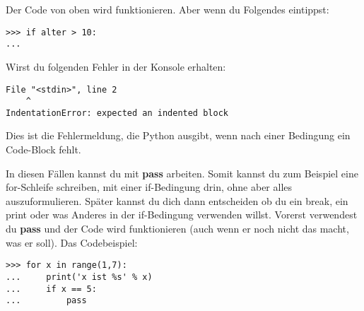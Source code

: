 \noindent
Der Code von oben wird funktionieren. Aber wenn du Folgendes eintippst:

\begin{Verbatim}[frame=single]
>>> if alter > 10:
...
\end{Verbatim}

\noindent
Wirst du folgenden Fehler in der Konsole erhalten:

\begin{Verbatim}[frame=single]
  File "<stdin>", line 2
    ^
IndentationError: expected an indented block
\end{Verbatim}

Dies ist die Fehlermeldung, die Python ausgibt, wenn nach einer Bedingung ein Code-Block fehlt.
\par
In diesen Fällen kannst du mit \textbf{pass} arbeiten. Somit kannst du zum Beispiel eine for-Schleife schreiben, mit einer if-Bedingung drin, ohne aber alles auszuformulieren. Später kannst du dich dann entscheiden ob du ein break, ein print oder was Anderes in der if-Bedingung verwenden willst. Vorerst verwendest du \textbf{pass} und der Code wird funktionieren (auch wenn er noch nicht das macht, was er soll). Das Codebeispiel:

\begin{Verbatim}[frame=single]
>>> for x in range(1,7):
...     print('x ist %s' % x)
...     if x == 5:
...         pass
\end{Verbatim}

